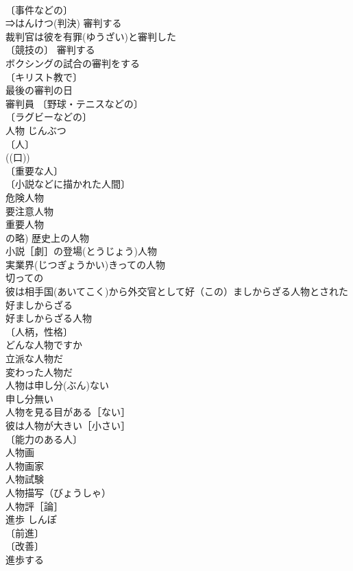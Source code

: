 \documentclass[8pt]{extreport}
\begin{document}
\begin{CJK}{UTF8}{min}
\\	〔事件などの〕
\\	⇒はんけつ(判決) 審判する 
\\	裁判官は彼を有罪(ゆうざい)と審判した 
\\	〔競技の〕 審判する 
\\	ボクシングの試合の審判をする 
\\	〔キリスト教で〕
\\	最後の審判の日 
\\	審判員 〔野球・テニスなどの〕
\\	〔ラグビーなどの〕
\\	人物	じんぶつ	
\\	〔人〕
\\	((口)) 
\\	〔重要な人〕
\\	〔小説などに描かれた人間〕
\\	危険人物 
\\	要注意人物 
\\	重要人物 
\\	の略) 歴史上の人物 
\\	小説［劇］の登場(とうじょう)人物 
\\	実業界(じつぎょうかい)きっての人物 
\\	切っての 
\\	彼は相手国(あいてこく)から外交官として好（この）ましからざる人物とされた 
\\	好ましからざる　
\\	好ましからざる人物 
\\	〔人柄，性格〕
\\	どんな人物ですか 
\\	立派な人物だ 
\\	変わった人物だ 
\\	人物は申し分(ぶん)ない 
\\	申し分無い　
\\	人物を見る目がある［ない］ 
\\	彼は人物が大きい［小さい］ 
\\	〔能力のある人〕
\\	人物画 
\\	人物画家 
\\	人物試験 
\\	人物描写（びょうしゃ） 
\\	人物評［論］ 
\\	進歩	しんぽ	
\\	〔前進〕
\\	〔改善〕
\\	進歩する 

\end{CJK}
\end{document}
